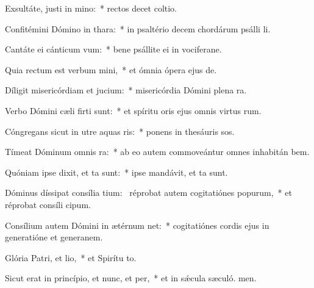 \item Exsultáte, justi in mino:~* rectos decet coltio.
\item Confitémini Dómino in thara:~* in psaltério decem chordárum psálli li.
\item Cantáte ei cánticum vum:~* bene psállite ei in vociferane.
\item Quia rectum est verbum mini,~* et ómnia ópera ejus  de.
\item Díligit misericórdiam et jucium:~* misericórdia Dómini plena  ra.
\item Verbo Dómini cæli firti sunt:~* et spíritu oris ejus omnis virtus rum.
\item Cóngregans sicut in utre aquas ris:~* ponens in thesáuris sos.
\item Tímeat Dóminum omnis ra:~* ab eo autem commoveántur omnes inhabitán bem.
\item Quóniam ipse dixit, et ta sunt:~* ipse mandávit, et ta sunt.
\item Dóminus díssipat consília tium:~\pscross{} réprobat autem cogitatiónes popurum,~* et réprobat consíli cipum.
\item Consílium autem Dómini in ætérnum net:~* cogitatiónes cordis ejus in generatióne et generanem.
\item Glória Patri, et lio,~* et Spirítu to.
\item Sicut erat in princípio, et nunc, et per,~* et in sǽcula sæculó. men.
